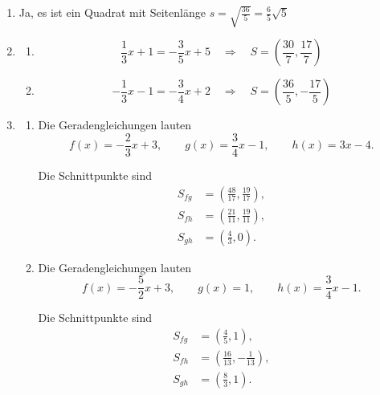 \begin{enumerate}

    \item
          Ja, es ist ein Quadrat mit Seitenlänge \(s = \sqrt{\frac{36}{5}} = \frac{6}{5} \sqrt{5}\)

    \item
          \begin{enumerate}
              \item
                    \[
                        \frac13 x+1=-\frac35 x+5
                        \quad\Longrightarrow\quad
                        \boxed{S=\left(\frac{30}{7} , \frac{17}{7}\right)}
                    \]

              \item
                    \[
                        -\frac13 x-1=-\frac34 x+2
                        \quad\Longrightarrow\quad
                        \boxed{S=\left(\frac{36}{5} , -\frac{17}{5}\right)}
                    \]
          \end{enumerate}

    \item
          \begin{enumerate}
              \item
                    Die Geradengleichungen lauten
                    \[
                        f(x)=-\frac23x+3,\qquad
                        g(x)=\frac34x-1,\qquad
                        h(x)=3x-4.
                    \]

                    Die Schnittpunkte sind
                    \[
                        \boxed{
                            \begin{aligned}
                                S_{fg} & =\left(\frac{48}{17}, \frac{19}{17}\right), \\[2mm]
                                S_{fh} & =\left(\frac{21}{11}, \frac{19}{11}\right), \\[2mm]
                                S_{gh} & =\left(\frac43, 0\right).
                            \end{aligned}
                        }
                    \]

              \item
                    Die Geradengleichungen lauten
                    \[
                        f(x)=-\frac52x+3,\qquad
                        g(x)=1,\qquad
                        h(x)=\frac34x-1.
                    \]

                    Die Schnittpunkte sind
                    \[
                        \boxed{
                            \begin{aligned}
                                S_{fg} & =\left(\frac45, 1\right),                   \\[2mm]
                                S_{fh} & =\left(\frac{16}{13}, -\frac{1}{13}\right), \\[2mm]
                                S_{gh} & =\left(\frac83, 1\right).
                            \end{aligned}
                        }
                    \]
          \end{enumerate}


\end{enumerate}
